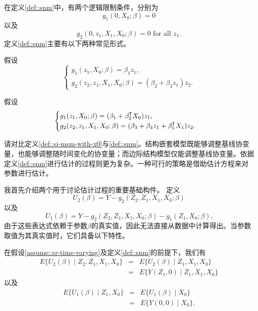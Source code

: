 在定义\ref{def::snm}中，有两个逻辑限制条件，分别为$$
g_1( 0, X_0; \beta)  = 0
$$以及$$
g_2(0, z_1,  X_1,  X_0; \beta) =0   \text{ for all } z_1.
$$定义\ref{def::snm}主要有以下两种常见形式。

\begin{example}
\label{example::snm-leading1}
假设
$$
    \begin{cases}
g_1( z_1, X_0; \beta)  =  \beta_1 z_1, \\
g_2(z_2, z_1,  X_1,  X_0; \beta) =  (\beta_2 + \beta_3 z_1  ) z_2 .
    \end{cases}    
  $$
\end{example}

\begin{example}
\label{example::snm-leading2}
假设
$$
    \begin{cases}
g_1( z_1, X_0; \beta) = (\beta_1 + \beta_2^{\mkern-1.5mu\mathsf{T}} X_0) z_1, \\
g_2(z_2, z_1,  X_1,  X_0; \beta) = (\beta_3 + \beta_4 z_1  + \beta_5^{\mkern-1.5mu\mathsf{T}} X_1 ) z_2.
    \end{cases}    
    $$
\end{example}
 


请对比定义\ref{def::si-msm-with-x0}与\ref{def::snm}。结构嵌套模型既能够调整基线协变量，也能够调整随时间变化的协变量；而边际结构模型仅能调整基线协变量。依据定义\ref{def::snm}进行估计的过程则更为复杂。一种可行的策略是借助估计方程来对参数进行估计。 

我首先介绍两个用于讨论估计过程的重要基础构件。  
定义  
$$
U_2(\beta) = Y- g_2(Z_2, Z_1, X_1, X_0;\beta) 
$$  
以及  
$$
U_1(\beta) = Y- g_2(Z_2, Z_1, X_1, X_0;\beta)  - g_1( Z_1, X_0;\beta) .
$$  
由于这些表达式依赖于参数$\beta$的真实值，因此无法直接从数据中计算得出。当参数取值为其真实值时，它们具备以下特性。 


\begin{lemma}
\label{lemma::snm-1}
在假设\ref{assume::sr-time-varying}及定义\ref{def::snm}的前提下，我们有
\begin{eqnarray*}
E\{  U_2(\beta)  \mid Z_2, Z_1, X_1, X_0 \}  &=&  E\{  U_2(\beta)  \mid  Z_1, X_1, X_0 \}  \\
&=&  E\{   Y(Z_1,0) \mid  Z_1, X_1, X_0 \}
\end{eqnarray*}
以及
\begin{eqnarray*}
E\{  U_1(\beta)  \mid  Z_1, X_0 \}  &=&  E\{  U_1(\beta)  \mid  X_0 \}  \\
&=&  E\{   Y(0,0) \mid   X_0 \}.
\end{eqnarray*}
\end{lemma}


